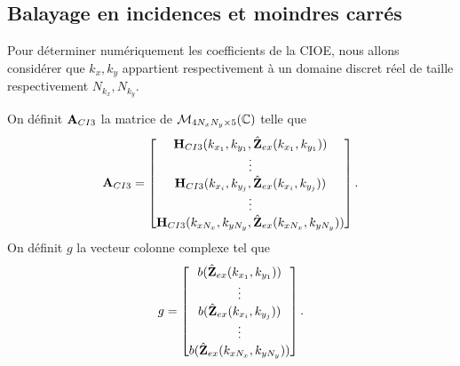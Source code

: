 

  \subsection{Balayage en incidences et moindres carrés}

    Pour déterminer numériquement les coefficients de la CIOE, nous allons considérer que \(k_x,k_y\) appartient respectivement à un domaine discret réel de taille respectivement \(N_{k_x}, N_{k_y}\).

    \begin{defn}
      On définit \(\mathbf{A}_{CI3}\) la matrice de \(\mathcal{M}_{4N_xN_y\times5}(\mathbb C)\) telle que
      \begin{equation*}
        \mathbf{A}_{CI3} = 
        \begin{bmatrix}
          \mathbf{H}_{CI3}(k_{x_1},k_{y_1},\hat{\mathbf{Z}}_{ex}(k_{x_1},k_{y_1}))
          \\
          \vdots
          \\
          \mathbf{H}_{CI3}(k_{x_i},k_{y_j},\hat{\mathbf{Z}}_{ex}(k_{x_i},k_{y_j}))
          \\
          \vdots
          \\
          \mathbf{H}_{CI3}(k_{xN_x},k_{yN_y},\hat{\mathbf{Z}}_{ex}(k_{xN_x},k_{yN_y}))
        \end{bmatrix}.
      \end{equation*}
      On définit \(g\) la vecteur colonne complexe tel que
      \begin{equation*}
        g = 
        \begin{bmatrix}
          b(\hat{\mathbf{Z}}_{ex}(k_{x_1},k_{y_1}))
          \\
          \vdots
          \\
          b(\hat{\mathbf{Z}}_{ex}(k_{x_i},k_{y_j}))
          \\
          \vdots
          \\
          b(\hat{\mathbf{Z}}_{ex}(k_{xN_x},k_{yN_y}))
        \end{bmatrix}.
      \end{equation*}
    \end{defn}

